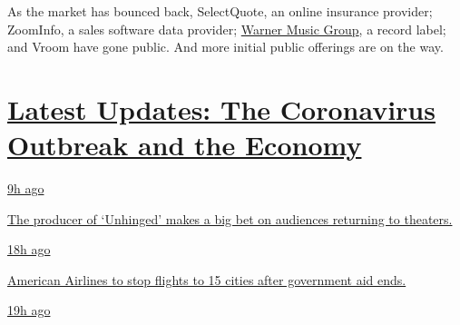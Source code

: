 As the market has bounced back, SelectQuote, an online insurance
provider; ZoomInfo, a sales software data provider;
\href{https://www.nytimes3xbfgragh.onion/2020/05/26/business/media/warner-music-ipo.html}{Warner
Music Group}, a record label; and Vroom have gone public. And more
initial public offerings are on the way.

\hypertarget{latest-updates-the-coronavirus-outbreak-and-the-economy}{%
\section{\texorpdfstring{\href{https://www.nytimes3xbfgragh.onion/live/2020/08/20/business/stock-market-today-coronavirus?action=click\&pgtype=Article\&state=default\&region=MAIN_CONTENT_1\&context=storylines_live_updates}{Latest
Updates: The Coronavirus Outbreak and the
Economy}}{Latest Updates: The Coronavirus Outbreak and the Economy}}\label{latest-updates-the-coronavirus-outbreak-and-the-economy}}

\href{https://www.nytimes3xbfgragh.onion/live/2020/08/20/business/stock-market-today-coronavirus?action=click\&pgtype=Article\&state=default\&region=MAIN_CONTENT_1\&context=storylines_live_updates\#the-producer-of-unhinged-makes-a-big-bet-on-audiences-returning-to-theaters}{9h
ago}

\href{https://www.nytimes3xbfgragh.onion/live/2020/08/20/business/stock-market-today-coronavirus?action=click\&pgtype=Article\&state=default\&region=MAIN_CONTENT_1\&context=storylines_live_updates\#the-producer-of-unhinged-makes-a-big-bet-on-audiences-returning-to-theaters}{The
producer of `Unhinged' makes a big bet on audiences returning to
theaters.}

\href{https://www.nytimes3xbfgragh.onion/live/2020/08/20/business/stock-market-today-coronavirus?action=click\&pgtype=Article\&state=default\&region=MAIN_CONTENT_1\&context=storylines_live_updates\#american-airlines-to-stop-flights-to-15-cities-after-government-aid-ends}{18h
ago}

\href{https://www.nytimes3xbfgragh.onion/live/2020/08/20/business/stock-market-today-coronavirus?action=click\&pgtype=Article\&state=default\&region=MAIN_CONTENT_1\&context=storylines_live_updates\#american-airlines-to-stop-flights-to-15-cities-after-government-aid-ends}{American
Airlines to stop flights to 15 cities after government aid ends.}

\href{https://www.nytimes3xbfgragh.onion/live/2020/08/20/business/stock-market-today-coronavirus?action=click\&pgtype=Article\&state=default\&region=MAIN_CONTENT_1\&context=storylines_live_updates\#without-school-plays-and-assemblies-a-technicians-livelihood-withers}{19h
ago}


